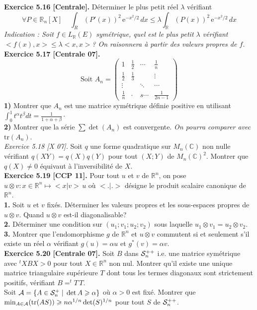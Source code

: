 \documentclass[a4paper,12pt,francais]{article}
\newcommand{\field}[1]{\mathbb{#1}}
\newcommand{\R}{\field{R}}
\newcommand{\C}{\field{C}}
\newcommand{\e}{\mbox{e}}
\newcommand{\tr}{\mbox{tr}}
\begin{document}
\noindent
{\bf Exercice 5.16 [Centrale].} Déterminer le plus petit réel $\lambda$ vérifiant 
$$\forall P \in \R_n[X]\; \; \; \; \int_R (P'(x))^2\, \e^{-x^2/2}\, dx \leqslant 
\lambda \int_\R (P(x))^2 \, \e^{-x^2/2} \, dx$$
{\it Indication : Soit $f \in L_\R(E)$ symétrique, quel est le plus petit $\lambda$ vérifiant $<f(x),x>\leqslant \lambda <x,x>$?  On raisonnera à partir des valeurs propres de $f$.}\\

\noindent
{\bf Exercice 5.17 [Centrale 07].}
$$\mbox{Soit } A_n=\left( 
\begin{array}{cccc}
1&\frac{1}{2} & \cdots & \frac{1}{n}\\
\frac{1}{2}& \frac{1}{3}&&\vdots\\
\vdots&&\ddots&\cdots\\
\frac{1}{n}&\cdot&s \cdots &\frac{1}{2n-1}
\end{array}
\right) $$
\indent
{\bf 1)} Montrer que $A_n$ est une matrice symétrique définie positive en utilisant $\int_0^1 t^{\alpha}t^{\beta} dt=\frac{1}{1+\alpha+\beta} \cdot$\\
\indent
{\bf 2)} Montrer que la série $\sum \det(A_n)$ est convergente. {\it On pourra comparer avec $\tr(A_n)$}.\\
 
\noindent
{\it Exercice 5.18 [X 07].} Soit $q$ une forme quadratique sur $M_n(\C)$ non nulle vérifiant $q(XY)=q(X)q(Y)$ pour tout $(X;Y)$ de $M_n(\C)^2$. Montrer que $q(X)\neq 0$ équivaut à l'inversibilité de $X$.\\ 

\noindent
{\bf Exercice 5.19 [CCP 11].} Pour tout $u$ et $v$ de $\R^n$, on pose $u \otimes v : x \in \R^n \mapsto <x|v>\, u$ où $<.|.>$ désigne le produit scalaire canonique de $\R^n$.\\
{\bf 1.} Soit $u$ et $v$ fixés. Déterminer les valeurs propres et les sous-espaces propres de $u\otimes v$. Quand $u \otimes v$ est-il diagonalisable?\\ %
{\bf 2.} Déterminer une condition sur $(u_1;v_1;u_2;v_2)$ sous laquelle $u_1 \otimes v_1=u_2 \otimes v_2$.\\
{\bf 3.} Montrer que l'endomorphisme $g$ de $\R^n$ et $u\otimes v$ commutent si et seulement s'il existe un réel $\alpha$ vérifiant $g(u)=\alpha u$ et $g^*(v)=\alpha v$.\\ 

\noindent
{\bf Exercice 5.20 [Centrale 07].}  Soit $B$ dans ${\cal{S}}_n^{++}$ i.e. une matrice symétrique avec $^tXBX >0$ pour tout $X\in \R^n$ non nul. Montrer qu'il existe une unique matrice triangulaire supérieure $T$ dont tous les termes diagonaux sont strictement positifs, vérifiant $B=^tT\, T$.\\
Soit ${\cal{A}}=\{ A \in {\cal{S}}_n^+\; | \; \det A \geqslant \alpha \}$ où $\alpha >0$ est fixé. Montrer que $\min_{A \in {\cal{A}}} (\tr (AS)) \geqslant n \alpha^{1/n} \det(S)^{1/n}$ pour tout $S$ de ${\cal{S}}_n^{++}$.\\
\end{document}
